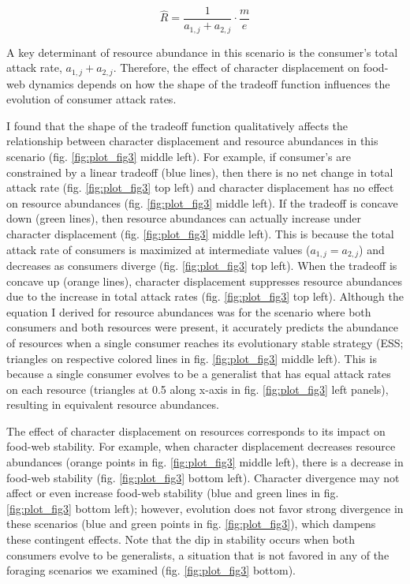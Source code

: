 \documentclass[11pt,]{article}
\begin{document}
\begin{equation} \label{eq:5}
  \hat{R}=\frac{1}{a_{1,j}+a_{2,j}}\cdot\frac{m}{e}
\end{equation}

A key determinant of resource abundance in this scenario is the
consumer's total attack rate, \(a_{1,j}+a_{2,j}\). Therefore, the effect
of character displacement on food-web dynamics depends on how the shape
of the tradeoff function influences the evolution of consumer attack
rates.

I found that the shape of the tradeoff function qualitatively affects
the relationship between character displacement and resource abundances
in this scenario (fig. \ref{fig:plot_fig3} middle left). For example, if
consumer's are constrained by a linear tradeoff (blue lines), then there
is no net change in total attack rate (fig. \ref{fig:plot_fig3} top
left) and character displacement has no effect on resource abundances
(fig. \ref{fig:plot_fig3} middle left). If the tradeoff is concave down
(green lines), then resource abundances can actually increase under
character displacement (fig. \ref{fig:plot_fig3} middle left). This is
because the total attack rate of consumers is maximized at intermediate
values (\(a_{1,j}=a_{2,j}\)) and decreases as consumers diverge (fig.
\ref{fig:plot_fig3} top left). When the tradeoff is concave up (orange
lines), character displacement suppresses resource abundances due to the
increase in total attack rates (fig. \ref{fig:plot_fig3} top left).
Although the equation I derived for resource abundances was for the
scenario where both consumers and both resources were present, it
accurately predicts the abundance of resources when a single consumer
reaches its evolutionary stable strategy (ESS; triangles on respective
colored lines in fig. \ref{fig:plot_fig3} middle left). This is because
a single consumer evolves to be a generalist that has equal attack rates
on each resource (triangles at 0.5 along x-axis in fig.
\ref{fig:plot_fig3} left panels), resulting in equivalent resource
abundances.

The effect of character displacement on resources corresponds to its
impact on food-web stability. For example, when character displacement
decreases resource abundances (orange points in fig. \ref{fig:plot_fig3}
middle left), there is a decrease in food-web stability (fig.
\ref{fig:plot_fig3} bottom left). Character divergence may not affect or
even increase food-web stability (blue and green lines in fig.
\ref{fig:plot_fig3} bottom left); however, evolution does not favor
strong divergence in these scenarios (blue and green points in fig.
\ref{fig:plot_fig3}), which dampens these contingent effects. Note that
the dip in stability occurs when both consumers evolve to be
generalists, a situation that is not favored in any of the foraging
scenarios we examined (fig. \ref{fig:plot_fig3} bottom).
\end{document}
